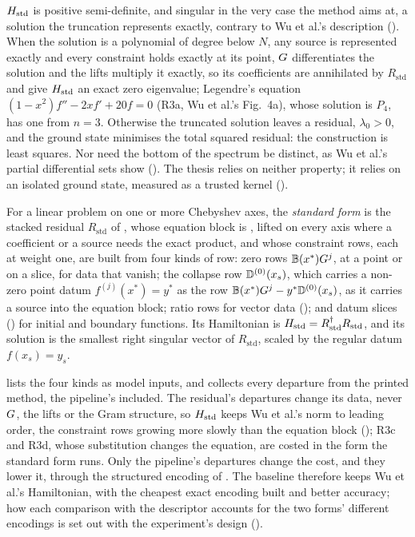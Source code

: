 $H_{\mathrm{std}}$ is positive semi-definite, and singular in the very case the method aims at, a solution the truncation represents exactly, contrary to Wu et al.'s description (). When the solution is a polynomial of degree below $N$, any source is represented exactly and every constraint holds exactly at its point, $G$ differentiates the solution and the lifts multiply it exactly, so its coefficients are annihilated by $R_{\mathrm{std}}$ and give $H_{\mathrm{std}}$ an exact zero eigenvalue; Legendre's equation $(1-x^2)f''-2xf'+20f=0$ (R3a, Wu et al.'s Fig.~4a), whose solution is $P_4$, has one from $n=3$. Otherwise the truncated solution leaves a residual, $\lambda_0>0$, and the ground state minimises the total squared residual: the construction is least squares. Nor need the bottom of the spectrum be distinct, as Wu et al.'s partial differential sets show (). The thesis relies on neither property; it relies on an isolated ground state, measured as a trusted kernel ().

\begin{definition}
\label{def:standard-form}
For a linear problem on one or more Chebyshev axes, the \emph{standard form} is the stacked residual $R_{\mathrm{std}}$ of , whose equation block is , lifted on every axis where a coefficient or a source needs the exact product, and whose constraint rows, each at weight one, are built from four kinds of row: zero rows $\mathbb{B}(x^*)G^{j}$, at a point or on a slice, for data that vanish; the collapse row $\mathbb{D}^{(0)}(x_s)$, which carries a non-zero point datum $f^{(j)}(x^*)=y^*$ as the row $\mathbb{B}(x^*)G^{j}-y^*\mathbb{D}^{(0)}(x_s)$, as it carries a source into the equation block; ratio rows for vector data (); and datum slices () for initial and boundary functions. Its Hamiltonian is $H_{\mathrm{std}}=R_{\mathrm{std}}^{\dagger}R_{\mathrm{std}}$, and its solution is the smallest right singular vector of $R_{\mathrm{std}}$, scaled by the regular datum $f(x_s)=y_s$.
\end{definition}

 lists the four kinds as model inputs, and  collects every departure from the printed method, the pipeline's included. The residual's departures change its data, never $G$, the lifts or the Gram structure, so $H_{\mathrm{std}}$ keeps Wu et al.'s norm to leading order, the constraint rows growing more slowly than the equation block (); R3c and R3d, whose substitution changes the equation, are costed in the form the standard form runs. Only the pipeline's departures change the cost, and they lower it, through the structured encoding of . The baseline therefore keeps Wu et al.'s Hamiltonian, with the cheapest exact encoding built and better accuracy; how each comparison with the descriptor accounts for the two forms' different encodings is set out with the experiment's design ().

